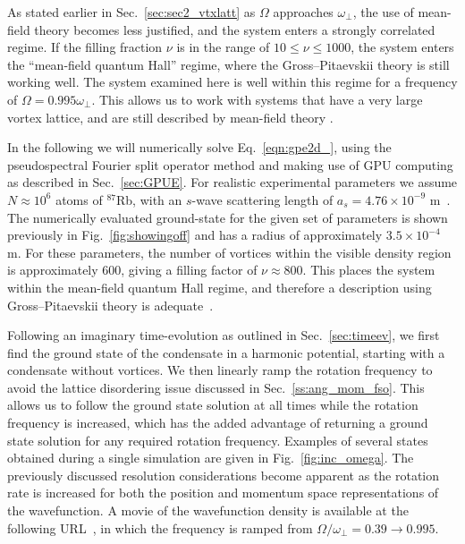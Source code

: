 As stated earlier in Sec.~\ref{sec:sec2_vtxlatt} as $\Omega$ approaches $\omega_\perp$, the use of mean-field theory becomes less justified, and the system enters a strongly correlated regime. If the filling fraction $\nu$ is in the range of $10 \leq \nu \leq 1000$, the system enters the ``mean-field quantum Hall'' regime, where the Gross--Pitaevskii theory is still working well. The system examined here is well within this regime for a frequency of $\Omega = 0.995\omega_\perp$. This allows us to work with systems that have a very large vortex lattice, and are still described by mean-field theory \cite{BEC:Fetter_revmodphys_2009}.

In the following we will numerically solve Eq.~\eqref{eqn:gpe2d_}, using the pseudospectral Fourier split operator method and making use of GPU computing as described in Sec.~\ref{sec:GPUE}. For realistic experimental parameters we assume  $N\approx 10^6$ atoms of $^{87}$Rb, with an $s$-wave scattering length of $a_s=4.76\times10^{-9}$ m~\cite{AO:Roberts_prl_1998}. The numerically evaluated ground-state for the given set of parameters is shown previously in Fig.~\ref{fig:showingoff} and has a radius of approximately $3.5\times 10^{-4}$ m. For these parameters, the number of vortices within the visible density region is approximately 600, giving a filling factor of $\nu \approx 800 $. This places the system within the mean-field quantum Hall regime, and therefore a description using Gross--Pitaevskii theory is adequate~\cite{Vtx:Schweikhard_prl_2004}.

Following an imaginary time-evolution as outlined in Sec.~\ref{sec:timeev}, we first find the ground state of the condensate in a harmonic potential, starting with a condensate without vortices. We then linearly ramp the rotation frequency to avoid the lattice disordering issue discussed in Sec.~\ref{ss:ang_mom_fso}. This allows us to follow the ground state solution at all times while the rotation frequency is increased, which has the added advantage of returning a ground state solution for any required rotation frequency. Examples of several states obtained during a single simulation are given in Fig.~\ref{fig:inc_omega}. The previously discussed resolution considerations become apparent as the rotation rate is increased for both the position and momentum space representations of the wavefunction. A movie of the wavefunction density is available at the following URL~\cite{YT:BEC_gen}, in which the frequency is ramped from $\Omega/\omega_\perp = 0.39 \to 0.995$.

